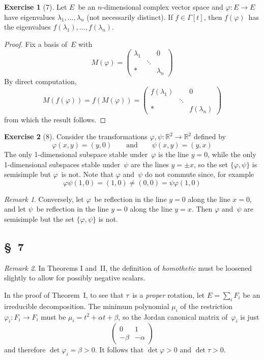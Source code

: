 \documentclass[letterpaper,12pt]{article}
\newcommand{\R}{\mathbb{R}}
\theoremstyle{definition}
\newtheorem*{exer}{Exercise}
\theoremstyle{remark}
\newtheorem*{rmk}{Remark}
\begin{document}
\begin{exer}[7]
Let \(E\)~be an \(n\)-dimensional complex vector space and \(\varphi:E\to E\) have eigenvalues \(\lambda_1,\ldots,\lambda_n\) (not necessarily distinct). If \(f\in\Gamma[t]\), then \(f(\varphi)\)~has the eigenvalues \(f(\lambda_1),\ldots,f(\lambda_n)\).
\end{exer}
\begin{proof}
Fix a basis of~\(E\) with
\[M(\varphi)=\begin{pmatrix}
\lambda_1&&0\\
&\ddots&\\
*&&\lambda_n
\end{pmatrix}\]
By direct computation,
\[M(f(\varphi))=f(M(\varphi))=\begin{pmatrix}
f(\lambda_1)&&0\\
&\ddots&\\
*&&f(\lambda_n)
\end{pmatrix}\]
from which the result follows.
\end{proof}

\begin{exer}[8] Consider the transformations \(\varphi,\psi:\R^2\to\R^2\) defined by
\[\varphi(x,y)=(y,0)\qquad\text{and}\qquad\psi(x,y)=(y,x)\]
The only 1-dimensional subspace stable under~\(\varphi\) is the line \(y=0\), while the only 1-dimensional subspaces stable under~\(\psi\) are the lines \(y=\pm x\), so the set \(\{\varphi,\psi\}\) is semisimple but \(\varphi\)~is not. Note that \(\varphi\) and~\(\psi\) do not commute since, for example
\[\varphi\psi(1,0)=(1,0)\ne(0,0)=\psi\varphi(1,0)\]
\end{exer}
\begin{rmk}
Conversely, let \(\varphi\)~be reflection in the line \(y=0\) along the line \(x=0\), and let \(\psi\)~be reflection in the line \(y=0\) along the line \(y=x\). Then \(\varphi\) and~\(\psi\) are semisimple but the set \(\{\varphi,\psi\}\) is not.
\end{rmk}

\subsection*{\S~7}
\begin{rmk}
In Theorems I and~II, the definition of \emph{homothetic} must be loosened slightly to allow for possibly negative scalars.

In the proof of Theorem~I, to see that \(\tau\)~is a \emph{proper} rotation, let \(E=\sum_i F_i\) be an irreducible decomposition. The minimum polynomial \(\mu_i\) of the restriction \(\varphi_i:F_i\to F_i\) must be \(\mu_i=t^2+\alpha t+\beta\), so the Jordan canonical matrix of~\(\varphi_i\) is just
\[\begin{pmatrix}
0&1\\
-\beta&-\alpha
\end{pmatrix}\]
and therefore \(\det\varphi_i=\beta>0\). It follows that \(\det\varphi>0\) and \(\det\tau>0\).
\end{rmk}
\end{document}
